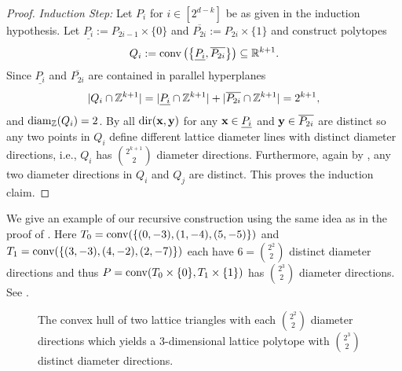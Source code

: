 \begin{proof}
    \emph{Induction Step:} Let $P_i$ for $i \in [2^{d-k}]$ be as given in the induction hypothesis. Let $\underline{P_i}:= P_{2i-1} \times \{0\}$ and $\overline{P_{2i}}:= P_{2i} \times \{1\}$ and construct polytopes
    \begin{align*}
        Q_i:= \operatorname{conv} \left( \left\{ \underline{P_i},\overline{P_{2i}}  \right\} \right)\subseteq \mathbb{R}^{k+1}.
    \end{align*}
    Since $\underline{P_i}$ and $\overline{P_{2i}}$ are contained in parallel hyperplanes
    \begin{align*}
        |Q_i \cap \mathbb{Z}^{k+1}| = |\underline{P_i} \cap \mathbb{Z}^{k+1}| +|\overline{P_{2i}} \cap \mathbb{Z}^{k+1}| = 2^{k+1}, 
    \end{align*}
    and $\operatorname{diam_{\mathbb{Z}}}(Q_i)=2$. By  all $\operatorname{dir}(\mathbf{x},\mathbf{y})$ for any $\mathbf{x} \in \underline{P_i}$ and $\mathbf{y} \in \overline{P_{2i}}$ are distinct so any two points in $Q_i$ define different lattice diameter lines with distinct diameter directions, i.e., $Q_i$ has $\binom{2^{k+1}}{2}$ diameter directions. Furthermore, again by , any two diameter directions in $Q_i$ and $Q_j$ are distinct.
    This proves the induction claim. 
\end{proof}

\begin{example}
    We give an example of our recursive construction using the same idea as in the proof of \mbox{}.
    Here $T_0=\operatorname{conv}(\{(0,-3), (1,-4), (5,-5)\})$ and $T_1 = \operatorname{conv}(\{ (3,-3),(4,-2), (2,-7)\})$ each have $6=\binom{2^2}{2}$ distinct diameter directions and thus $P = \operatorname{conv}( T_0 \times \{0\}, T_1 \times \{1\})$ has $\binom{2^3}{2}$ diameter directions. See .
\begin{figure}[ht!]
    \centering
    
    \caption{The convex hull of two lattice triangles with each $\binom{2^2}{2}$ diameter directions which yields a $3$-dimensional lattice polytope with $\binom{2^3}{2}$ distinct diameter directions.}
    \label{fig:construction-diam-dir}
\end{figure}
%
\end{example}


   



